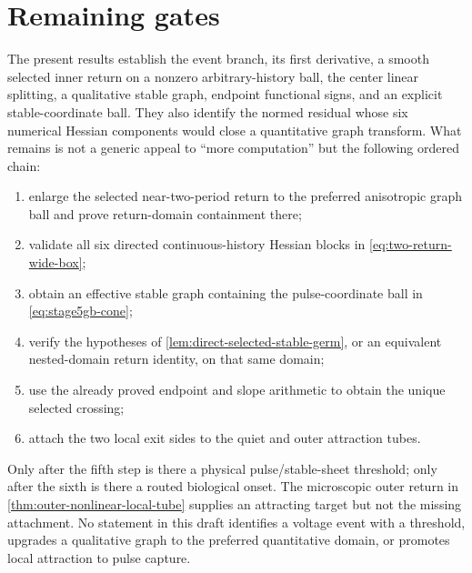\section{Remaining gates}\label{sec:discussion}

The present results establish the event branch, its first derivative, a
smooth selected inner return on a nonzero arbitrary-history ball, the center
linear splitting, a qualitative stable graph, endpoint functional signs, and
an explicit stable-coordinate ball.  They also identify the normed residual
whose six numerical Hessian components would close a quantitative graph
transform.  What remains is not a generic appeal to ``more computation'' but
the following ordered chain:
\begin{enumerate}
\item enlarge the selected near-two-period return to the preferred anisotropic
  graph ball and prove return-domain containment there;
\item validate all six directed continuous-history Hessian blocks in
  \cref{eq:two-return-wide-box};
\item obtain an effective stable graph containing the pulse-coordinate ball
  in \cref{eq:stage5gb-cone};
\item verify the hypotheses of \cref{lem:direct-selected-stable-germ}, or an
  equivalent nested-domain return identity, on that same domain;
\item use the already proved endpoint and slope arithmetic to obtain the
  unique selected crossing;
\item attach the two local exit sides to the quiet and outer attraction tubes.
\end{enumerate}

Only after the fifth step is there a physical pulse/stable-sheet threshold;
only after the sixth is there a routed biological onset.  The microscopic
outer return in \cref{thm:outer-nonlinear-local-tube} supplies an attracting
target but not the missing attachment.  No statement in this draft identifies
a voltage event with a threshold, upgrades a qualitative graph to the
preferred quantitative domain, or promotes local attraction to pulse capture.

